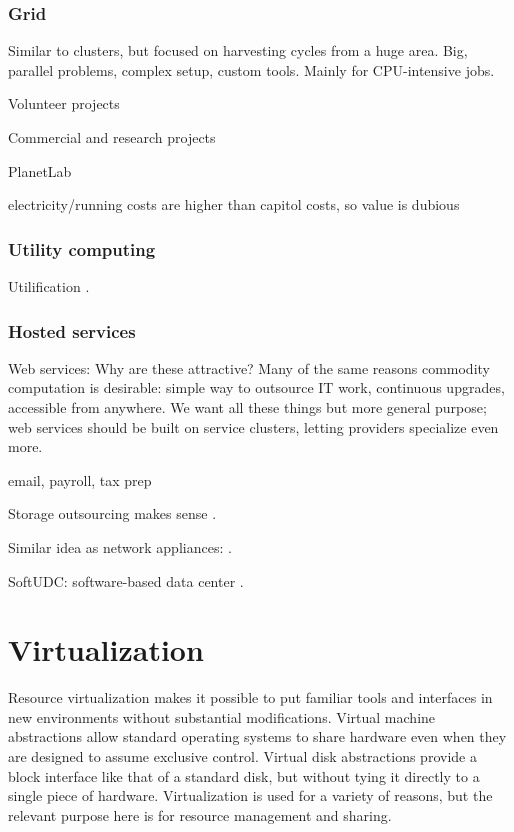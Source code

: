 \subsubsection{Grid}

Similar to clusters, but focused on harvesting cycles from a huge area. Big, parallel problems, complex setup, custom tools. Mainly for CPU-intensive jobs.

Volunteer projects

Commercial and research projects

PlanetLab

electricity/running costs are higher than capitol costs, so value is dubious

\cite{foster}
\cite{figueiredo03}

\cite{zhao04}

\subsubsection{Utility computing}

Utilification \cite{wilkes04}.

\subsubsection{Hosted services}

Web services: Why are these attractive? Many of the same reasons commodity computation is desirable: simple way to outsource IT work, continuous upgrades, accessible from anywhere. We want all these things but more general purpose; web services should be built on service clusters, letting providers specialize even more.

email, payroll, tax prep

Storage outsourcing makes sense \cite{ng}.


Similar idea as network appliances: \cite{sapuntzakis03}.

SoftUDC: software-based data center \cite{kallahalla}.

\section{Virtualization}

Resource virtualization makes it possible to put familiar tools and interfaces in new environments without substantial modifications. Virtual machine abstractions allow standard operating systems to share hardware even when they are designed to assume exclusive control. Virtual disk abstractions provide a block interface like that of a standard disk, but without tying it directly to a single piece of hardware. Virtualization is used for a variety of reasons, but the relevant purpose here is for resource management and sharing.

